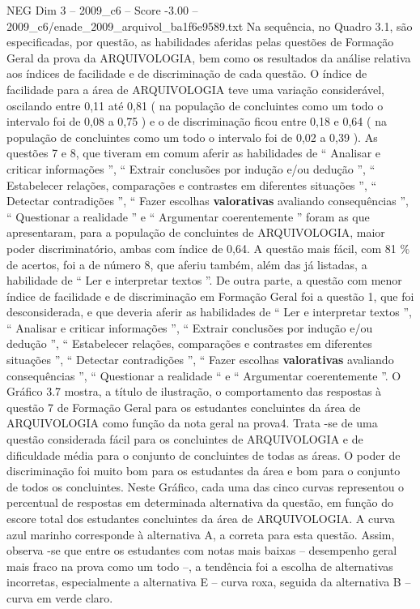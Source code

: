 \begin{textsample}{NEG Dim 3 – 2009\_c6 – Score -3.00 – 2009\_c6/enade\_2009\_arquivol\_ba1f6e9589.txt}
Na sequência, no Quadro 3.1, são especificadas, por questão, as habilidades aferidas pelas questões de Formação Geral da prova da ARQUIVOLOGIA, bem como os resultados da análise relativa aos índices de facilidade e de discriminação de cada questão.
O índice de facilidade para a área de ARQUIVOLOGIA teve uma variação considerável, oscilando entre 0,11 até 0,81 ( na população de concluintes como um todo o intervalo foi de 0,08 a 0,75 ) e o de discriminação ficou entre 0,18 e 0,64 ( na população de concluintes como um todo o intervalo foi de 0,02 a 0,39 ).
As questões 7 e 8, que tiveram em comum aferir as habilidades de “ Analisar e criticar informações ”, “ Extrair conclusões por indução e/ou dedução ”, “ Estabelecer relações, comparações e contrastes em diferentes situações ”, “ Detectar contradições ”, “ Fazer escolhas \textbf{valorativas} avaliando consequências ”, “ Questionar a realidade ” e “ Argumentar coerentemente ” foram as que apresentaram, para a população de concluintes de ARQUIVOLOGIA, maior poder discriminatório, ambas com índice de 0,64.
A questão mais fácil, com 81 \% de acertos, foi a de número 8, que aferiu também, além das já listadas, a habilidade de “ Ler e interpretar textos ”.
De outra parte, a questão com menor índice de facilidade e de discriminação em Formação Geral foi a questão 1, que foi desconsiderada, e que deveria aferir as habilidades de “ Ler e interpretar textos ”, “ Analisar e criticar informações ”, “ Extrair conclusões por indução e/ou dedução ”, “ Estabelecer relações, comparações e contrastes em diferentes situações ”, “ Detectar contradições ”, “ Fazer escolhas \textbf{valorativas} avaliando consequências ”, “ Questionar a realidade “ e “ Argumentar coerentemente ”.
O Gráfico 3.7 mostra, a título de ilustração, o comportamento das respostas à questão 7 de Formação Geral para os estudantes concluintes da área de ARQUIVOLOGIA como função da nota geral na prova4.
Trata -se de uma questão considerada fácil para os concluintes de ARQUIVOLOGIA e de dificuldade média para o conjunto de concluintes de todas as áreas.
O poder de discriminação foi muito bom para os estudantes da área e bom para o conjunto de todos os concluintes.
Neste Gráfico, cada uma das cinco curvas representou o percentual de respostas em determinada alternativa da questão, em função do escore total dos estudantes concluintes da área de ARQUIVOLOGIA.
A curva azul marinho corresponde à alternativa A, a correta para esta questão.
Assim, observa -se que entre os estudantes com notas mais baixas – desempenho geral mais fraco na prova como um todo –, a tendência foi a escolha de alternativas incorretas, especialmente a alternativa E – curva roxa, seguida da alternativa B – curva em verde claro.

\end{textsample}
